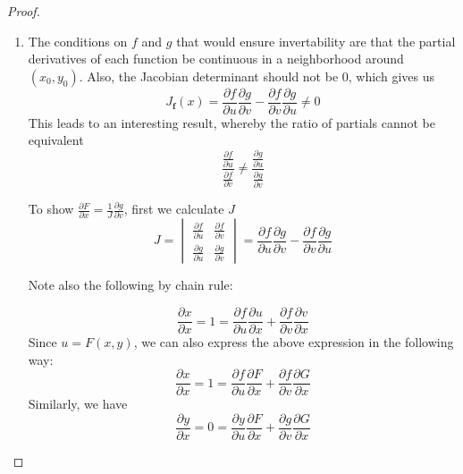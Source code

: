 \documentclass[12pt]{article}
\newcommand{\bvec}[1]{\textbf{#1}}
\newcommand{\partialD}[2]{\frac{\partial #1}{\partial #2}}
\begin{document}
\begin{proof}
\begin{enumerate}
    \item The conditions on $f$ and $g$ that would ensure invertability are that the partial derivatives of each function be continuous in a neighborhood around $(x_0,y_0)$. Also, the Jacobian determinant should not be $0$, which gives us
    \[
        J_{\bvec{f}}(x)=\frac{\partial f}{\partial u}\frac{\partial g}{\partial v}-\frac{\partial f}{\partial v}\frac{\partial g}{\partial u}\not=0
    \]
    This leads to an interesting result, whereby the ratio of partials cannot be equivalent
    \[
        \frac{
            \frac{\partial f}{\partial u}
        }{
            \frac{\partial f}{\partial v}
        }\not=\frac{
            \frac{\partial g}{\partial u}
        }{
            \frac{\partial g}{\partial v}
        }
    \]

    To show $\frac{\partial F}{\partial x}=\frac{1}{J}\frac{\partial g}{\partial v}$, first we calculate $J$
    \[
        J=\begin{vmatrix}
            \frac{\partial f}{\partial u} & \frac{\partial f}{\partial v} \\
            \frac{\partial g}{\partial u} & \frac{\partial g}{\partial v}
        \end{vmatrix} =\frac{\partial f}{\partial u}\frac{\partial g}{\partial v} - \frac{\partial f}{\partial v}\frac{\partial g}{\partial u} 
    \]

    Note also the following by chain rule:

    \[\partialD{x}{x}=1=\partialD{f}{u}\partialD{u}{x} +\frac{\partial f}{\partial v}\frac{\partial v}{\partial x}\]
    Since $u=F(x,y)$, we can also express the above expression in the following way:
    \[\partialD{x}{x}=1=\partialD{f}{u}\partialD{F}{x} +\partialD{f}{v}\partialD{G}{x}\]
    Similarly, we have 
    \[
        \partialD{y}{x}=0=\partialD{y}{u}\partialD{F}{x}+\partialD{g}{v}\partialD{G}{x}    
    \]


\end{enumerate}
\end{proof}
\end{document}
